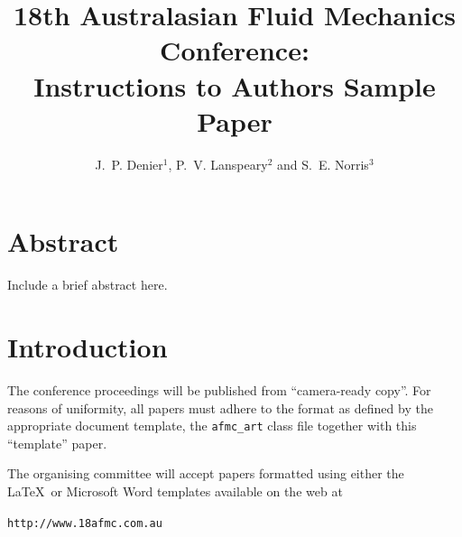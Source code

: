 \documentclass[twocolumn]{afmc_art}
\begin{document}
%
%
%
%
%
%
%
%
\title{18th Australasian Fluid Mechanics Conference:\\
       Instructions to Authors Sample Paper}
%
%
%
\author{J.~P. Denier$^1$, P.~V. Lanspeary$^2$ and S.~E. Norris$^3$}

%
\maketitle
%
%
\section{Abstract}
Include a brief abstract here.

\section{Introduction}
The conference proceedings will be published from
``camera-ready copy''. For reasons of uniformity, all papers must 
adhere to the format as defined by the appropriate document template,
the \texttt{afmc\_art} class file together 
with this ``template'' paper. 

The organising committee will accept papers formatted using either
the \LaTeX\ or Microsoft Word templates available on the web at\\
\centerline{\texttt{http://www.18afmc.com.au}}
\end{document}
